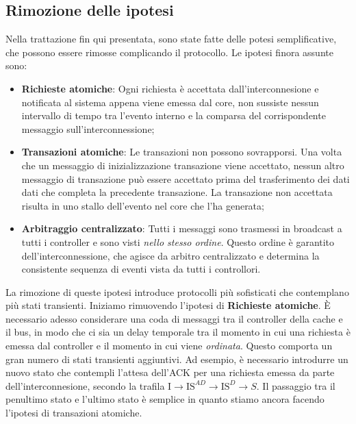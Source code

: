 \subsection{Rimozione delle ipotesi}
Nella trattazione fin qui presentata, sono state fatte delle potesi semplificative, che possono essere rimosse complicando il protocollo. Le ipotesi finora assunte sono:

\begin{itemize}
    \item \textbf{Richieste atomiche}: Ogni richiesta è accettata dall'interconnesione e notificata al sistema appena viene emessa dal core, non sussiste nessun intervallo di tempo tra l'evento interno e la comparsa del corrispondente messaggio sull'interconnessione;
    \item \textbf{Transazioni atomiche}: Le transazioni non possono sovrapporsi. Una volta che un messaggio di inizializzazione transazione viene accettato, nessun altro messaggio di transazione può essere accettato prima del trasferimento dei dati dati che completa la precedente transazione. La transazione non accettata risulta in uno stallo dell'evento nel core che l'ha generata;
    \item \textbf{Arbitraggio centralizzato}: Tutti i messaggi sono trasmessi in broadcast a tutti i controller e sono visti \textit{nello stesso ordine}. Questo ordine è garantito dell'interconnessione, che agisce da arbitro centralizzato e determina la consistente sequenza di eventi vista da tutti i controllori. 
\end{itemize}

\noindent La rimozione di queste ipotesi introduce protocolli più sofisticati che contemplano più stati transienti. Iniziamo rimuovendo l'ipotesi di \textbf{Richieste atomiche}. È necessario adesso considerare una coda di messaggi tra il controller della cache e il bus, in modo che ci sia un delay temporale tra il momento in cui una richiesta è emessa dal controller e il momento in cui viene \textit{ordinata}. Questo comporta un gran numero di stati transienti aggiuntivi. 
Ad esempio, è necessario introdurre un nuovo stato che contempli l'attesa dell'ACK per una richiesta emessa da parte dell'interconnesione, secondo la trafila $\text{I} \rightarrow \text{IS}^{AD} \rightarrow \text{IS}^{D} \rightarrow S$. Il passaggio tra il penultimo stato e l'ultimo stato è semplice in quanto stiamo ancora facendo l'ipotesi di transazioni atomiche. 

